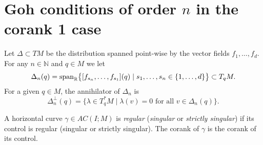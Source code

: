 \documentclass[12pt, reqno]{amsart}
\theoremstyle{plain}
\theoremstyle{definition}
\theoremstyle{remark}
\numberwithin{equation}{section}
\newcommand{\R}{\mathbb{R}}
\newcommand{\N}{\mathbb{N}}
\newcommand{\0}{\theta}
\newcommand{\1}{{-1}}
\renewcommand{\=}{\coloneqq}
\renewcommand{\.}{\dots}
\begin{document}
  
  
  
  
  
  
  
  
  
  
  
  
  
  
  
  
  
  
  
  
  
  
  
  
  
  
  
  
  
  
  
  
  
  
  
  
  
  
  
  
  
  
  
  
  
  
  
  
  
  
  
  
  
  
  
  
  
  
  
  
  
  
  
  

 
 \section{Goh conditions of order $n$ in the corank 1 case}
 
  
\label{GOH}

Let $\Delta\subset TM$ be the distribution spanned point-wise by the vector fields $f_1,\dots, f_d$. For any $n\in\N$ and $q\in M$ we let
\[
\Delta_n(q) = \mathrm{span}_\R \big \{ [f_{\j_n},\dots,f_{\j_1}] (q) \mid \j_1,\dots, \j_n \in \{1,\dots,d\} \big\}\subset T_qM.
\]
 For a given $q\in M$, the annihilator of $\Delta_n$ is 
 \[
 \Delta_n^\perp(q) = \big\{ \lambda \in T_q^* M \mid \lambda (v)= 0\textrm{ for all $v\in \Delta_n(q)$}\big\}.
 \]
 
 
	A horizontal curve $\gamma \in AC ( I ; M)$ is {\em regular} ({\em singular} or {\em strictly singular}) if its  control  is regular (singular or strictly singular). The corank of $\gamma$ is the corank of its control.
  
  
  
\end{document}

